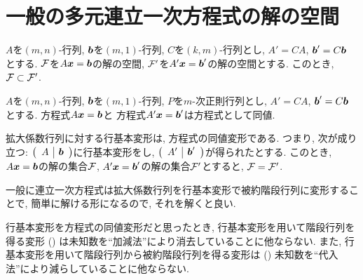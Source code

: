 \section{一般の多元連立一次方程式の解の空間}

\begin{lemma}
  \label{lem:subsol}
  $A$を$(m,n)$-行列,
  $\boldsymbol{b}$を$(m,1)$-行列,
  $C$を$(k,m)$-行列とし,
  $A'=CA$, $\boldsymbol{b}'=C\boldsymbol{b}$
  とする.
  $\mathcal{F}$を$A\boldsymbol{x}=\boldsymbol{b}$の解の空間,
  $\mathcal{F}'$を$A'\boldsymbol{x}=\boldsymbol{b}'$の解の空間とする.
  このとき,
  $\mathcal{F}\subset \mathcal{F}'$.
\end{lemma}

\begin{theorem}
  \label{thm:subsol}
  $A$を$(m,n)$-行列,
  $\boldsymbol{b}$を$(m,1)$-行列,
  $P$を$m$-次正則行列とし,
  $A'=CA$, $\boldsymbol{b}'=C\boldsymbol{b}$
  とする.
  方程式$A\boldsymbol{x}=\boldsymbol{b}$と
  方程式$A'\boldsymbol{x}=\boldsymbol{b}'$は方程式として同値.
\end{theorem}
\begin{cor}
  拡大係数行列に対する行基本変形は,
  方程式の同値変形である.
  つまり, 次が成り立つ:
  $\left(\begin{array}{c|c}A& \boldsymbol{b}\end{array}\right)$に行基本変形をし,
  $\left(\begin{array}{c|c}A'& \boldsymbol{b}'\end{array}\right)$が得られたとする.
  このとき,
  $A\boldsymbol{x}=\boldsymbol{b}$の解の集合$\mathcal{F}$,
  $A'\boldsymbol{x}=\boldsymbol{b}'$の解の集合$\mathcal{F}'$とすると, $\mathcal{F}=\mathcal{F}'$.
\end{cor}

\begin{remark}
  一般に連立一次方程式は拡大係数行列を行基本変形で被約階段行列に変形することで,
  簡単に解ける形になるので,
  それを解くと良い.
\end{remark}
\begin{remark}
  行基本変形を方程式の同値変形だと思ったとき,
  行基本変形を用いて階段行列を得る変形 ()
  は未知数を``加減法''により消去していることに他ならない.
  また,
  行基本変形を用いて階段行列から被約階段行列を得る変形は
  ()
  未知数を``代入法''により減らしていることに他ならない.
\end{remark}

